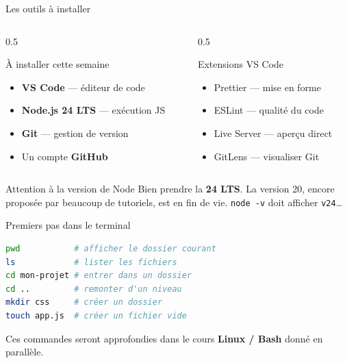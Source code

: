 \documentclass[aspectratio=169,11pt]{beamer}
\begin{document}
\begin{frame}{Les outils à installer}
  \begin{columns}[T]
    \begin{column}{0.5\textwidth}
      \begin{block}{À installer cette semaine}
        \begin{itemize}
          \item \textbf{VS Code} --- éditeur de code
          \item \textbf{Node.js 24 LTS} --- exécution JS
          \item \textbf{Git} --- gestion de version
          \item Un compte \textbf{GitHub}
        \end{itemize}
      \end{block}
    \end{column}
    \begin{column}{0.5\textwidth}
      \begin{exampleblock}{Extensions VS Code}
        \begin{itemize}
          \item Prettier --- mise en forme
          \item ESLint --- qualité du code
          \item Live Server --- aperçu direct
          \item GitLens --- visualiser Git
        \end{itemize}
      \end{exampleblock}
    \end{column}
  \end{columns}
  \vspace{0.25cm}
  \begin{alertblock}{Attention à la version de Node}
    Bien prendre la \textbf{24 LTS}. La version 20, encore proposée par beaucoup de tutoriels, est en fin de vie. \texttt{node -v} doit afficher \texttt{v24}\ldots
  \end{alertblock}
\end{frame}

\begin{frame}[fragile]{Premiers pas dans le terminal}
\begin{lstlisting}[language=bash]
pwd           # afficher le dossier courant
ls            # lister les fichiers
cd mon-projet # entrer dans un dossier
cd ..         # remonter d'un niveau
mkdir css     # créer un dossier
touch app.js  # créer un fichier vide
\end{lstlisting}
  \vspace{0.2cm}
  \begin{center}
    \small Ces commandes seront approfondies dans le cours \textbf{Linux / Bash} donné en parallèle.
  \end{center}
\end{frame}
\end{document}
